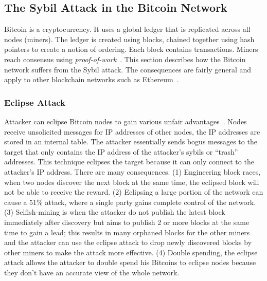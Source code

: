 
\subsection{The Sybil Attack in the Bitcoin Network}
Bitcoin is a cryptocurrency. It uses a global ledger that is replicated across
all nodes (miners). The ledger is created using blocks, chained together using
hash pointers to create a notion of ordering. Each block contains transactions.
Miners reach consensus using \emph{proof-of-work}~\cite{nakamoto2008bitcoin}.
This section describes how the Bitcoin network suffers from the Sybil attack.
The consequences are fairly general and apply to other blockchain networks such
as Ethereum~\cite{wood2014ethereum}.


\subsubsection{Eclipse Attack}
Attacker can eclipse Bitcoin nodes to gain various unfair
advantages~\cite{heilman2015eclipse}. Nodes receive unsolicited messages for IP
addresses of other nodes, the IP addresses are stored in an internal table. The
attacker essentially sends bogus messages to the target that only contains the
IP address of the attacker's sybils or ``trash'' addresses. This technique
eclipses the target because it can only connect to the attacker's IP address.
There are many consequences. (1) Engineering block races, when two nodes
discover the next block at the same time, the eclipsed block will not be able to
receive the reward. (2) Eclipsing a large portion of the network can cause a
51\% attack, where a single party gains complete control of the network. (3)
Selfish-mining is when the attacker do not publish the latest block immediately
after discovery but aims to publish 2 or more blocks at the same time to gain a
lead; this results in many orphaned blocks for the other miners and the attacker
can use the eclipse attack to drop newly discovered blocks by other miners to
make the attack more effective. (4) Double spending, the eclipse attack allows
the attacker to double spend his Bitcoins to eclipse nodes because they don't
have an accurate view of the whole network.


